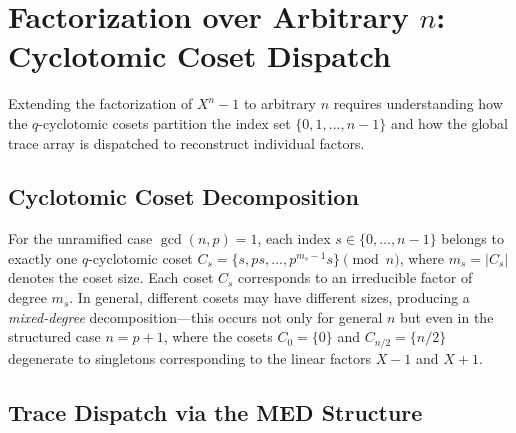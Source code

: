 \documentclass[12pt]{article}
\theoremstyle{plain}
\begin{document}
\section{Factorization over Arbitrary $n$: Cyclotomic Coset Dispatch}

Extending the factorization of $X^n-1$ to arbitrary $n$ requires understanding how the $q$-cyclotomic cosets partition the index set $\{0, 1, \dots, n-1\}$ and how the global trace array is dispatched to reconstruct individual factors.

\subsection{Cyclotomic Coset Decomposition}
For the unramified case $\gcd(n, p) = 1$, each index $s \in \{0, \dots, n-1\}$ belongs to exactly one $q$-cyclotomic coset $C_s = \{s, ps, \dots, p^{m_s-1}s \} \pmod{n}$, where $m_s = |C_s|$ denotes the coset size. Each coset $C_s$ corresponds to an irreducible factor of degree $m_s$. In general, different cosets may have different sizes, producing a \emph{mixed-degree} decomposition---this occurs not only for general $n$ but even in the structured case $n=p+1$, where the cosets $C_0 = \{0\}$ and $C_{n/2} = \{n/2\}$ degenerate to singletons corresponding to the linear factors $X-1$ and $X+1$.

\subsection{Trace Dispatch via the MED Structure}
\end{document}
